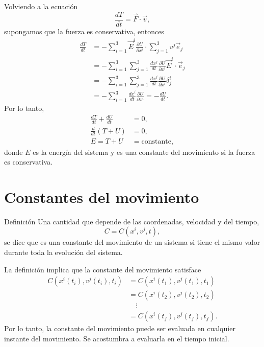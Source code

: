 \documentclass[../apunte_mecanica_clasica.tex]{subfiles}%
\begin{document}
Volviendo a la ecuación
\begin{equation*}
    \frac{dT}{dt}=\vec F\cdot\vec v,
\end{equation*}
supongamos que la fuerza es conservativa, entonces
\begin{align*}
    \frac{dT}{dt}
    &=-\sum_{i=1}^{3}\vec E^i\frac{\partial U}{\partial x^i}\cdot
      \sum_{j=1}^{3}v^j\vec e_j \\
    &=-\sum_{i=1}^{3}\sum_{j=1}^{3}\frac{dx^j}{dt}
      \frac{\partial U}{\partial x^i}\vec E^i\cdot\vec e_j \\
    &=-\sum_{i=1}^{3}\sum_{j=1}^{3}\frac{dx^j}{dt}
      \frac{\partial U}{\partial x^i}\delta^i_j \\
    &=-\sum_{i=1}^{3}\frac{dx^i}{dt}\frac{\partial U}{\partial x^i}
      =-\frac{dU}{dt}.
\end{align*}
Por lo tanto,
\begin{align*}
    \frac{dT}{dt}+\frac{dU}{dt}&=0,\\
    \frac{d}{dt}(T+U)&=0,\\
    E=T+U&=\text{constante},
\end{align*}
donde $E$ es la energía del sistema y es una constante del movimiento si la fuerza es conservativa.

\section{Constantes del movimiento}

\begin{apuntebloque}{Definición}
Una cantidad que depende de las coordenadas, velocidad y del tiempo,
\begin{equation*}
    C=C(x^i,v^j,t),
\end{equation*}
se dice que es una constante del movimiento de un sistema si tiene el mismo valor durante toda la evolución del sistema.
\end{apuntebloque}

La definición implica que la constante del movimiento satisface
\begin{align*}
    C(x^i(t_i),v^j(t_i),t_i)
    &=C(x^i(t_1),v^j(t_1),t_1) \\
    &=C(x^i(t_2),v^j(t_2),t_2) \\
    &\quad\vdots \\
    &=C(x^i(t_f),v^j(t_f),t_f).
\end{align*}
Por lo tanto, la constante del movimiento puede ser evaluada en cualquier instante del movimiento. Se acostumbra a evaluarla en el tiempo inicial.
\end{document}
